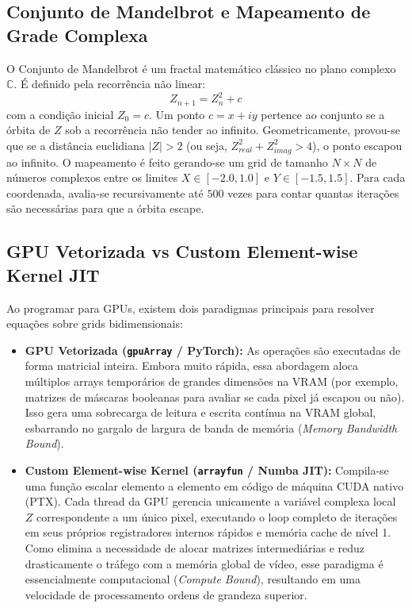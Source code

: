 \documentclass[12pt,a4paper]{article}
\begin{document}
\subsection{Conjunto de Mandelbrot e Mapeamento de Grade Complexa}
O Conjunto de Mandelbrot é um fractal matemático clássico no plano complexo $\mathbb{C}$. É definido pela recorrência não linear:
\[ Z_{n+1} = Z_n^2 + c \]
com a condição inicial $Z_0 = c$. Um ponto $c = x + iy$ pertence ao conjunto se a órbita de $Z$ sob a recorrência não tender ao infinito. Geometricamente, provou-se que se a distância euclidiana $|Z| > 2$ (ou seja, $Z_{real}^2 + Z_{imag}^2 > 4$), o ponto escapou ao infinito. O mapeamento é feito gerando-se um grid de tamanho $N \times N$ de números complexos entre os limites $X \in [-2.0, 1.0]$ e $Y \in [-1.5, 1.5]$. Para cada coordenada, avalia-se recursivamente até $500$ vezes para contar quantas iterações são necessárias para que a órbita escape.

\subsection{GPU Vetorizada vs Custom Element-wise Kernel JIT}
Ao programar para GPUs, existem dois paradigmas principais para resolver equações sobre grids bidimensionais:
\begin{itemize}
    \item \textbf{GPU Vetorizada (\texttt{gpuArray} / PyTorch):} As operações são executadas de forma matricial inteira. Embora muito rápida, essa abordagem aloca múltiplos arrays temporários de grandes dimensões na VRAM (por exemplo, matrizes de máscaras booleanas para avaliar se cada pixel já escapou ou não). Isso gera uma sobrecarga de leitura e escrita contínua na VRAM global, esbarrando no gargalo de largura de banda de memória (\textit{Memory Bandwidth Bound}).
    \item \textbf{Custom Element-wise Kernel (\texttt{arrayfun} / Numba JIT):} Compila-se uma função escalar elemento a elemento em código de máquina CUDA nativo (PTX). Cada thread da GPU gerencia unicamente a variável complexa local $Z$ correspondente a um único pixel, executando o loop completo de iterações em seus próprios registradores internos rápidos e memória cache de nível 1. Como elimina a necessidade de alocar matrizes intermediárias e reduz drasticamente o tráfego com a memória global de vídeo, esse paradigma é essencialmente computacional (\textit{Compute Bound}), resultando em uma velocidade de processamento ordens de grandeza superior.
\end{itemize}
\end{document}
